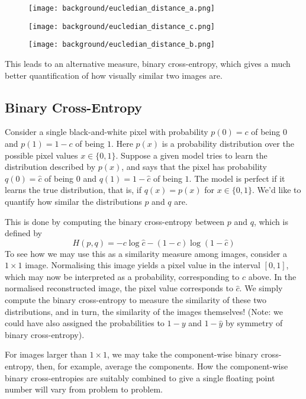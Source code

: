 \begin{figure}[!htb]
\centering
{}
\centering
  \texttt{[image: background/eucledian\_distance\_a.png]}
  \caption{}\label{fig:eucledian_distance_a}
\endminipage\hfill
{}
\centering
  \texttt{[image: background/eucledian\_distance\_c.png]}
  \caption{}\label{fig:eucledian_distance_c}
\endminipage\hfill
{}%
\centering
  \texttt{[image: background/eucledian\_distance\_b.png]}
  \caption{}\label{fig:eucledian_distance_b}
\endminipage
\end{figure}

This leads to an alternative measure, binary cross-entropy, which gives a much better quantification of how visually similar two images are.

\subsection{Binary Cross-Entropy}
Consider a single black-and-white pixel with probability $p(0) = c$ of being $0$ and $p(1) = 1 - c$ of being $1$. Here $p(x)$ is a probability distribution over the possible pixel values $x \in \{0, 1\}$. Suppose a given model tries to learn the distribution described by $p(x)$, and says that the pixel has probability $q(0) = \hat{c}$ of being $0$ and $q(1) = 1 - \hat{c}$ of being $1$. The model is perfect if it learns the true distribution, that is, if $q(x) = p(x)$ for $x\in\{0,1\}$. We'd like to quantify how similar the distributions $p$ and $q$ are.

This is done by computing the binary cross-entropy between $p$ and $q$, which is defined by $$H(p,q) = -c\log\hat{c} - (1-c)\log(1-\hat{c})$$ To see how we may use this as a similarity measure among images, consider a $1\times1$ image. Normalising this image yields a pixel value in the interval $[0, 1]$, which may now be interpreted as a probability, corresponding to $c$ above. In the normalised reconstructed image, the pixel value corresponds to $\hat{c}$. We simply compute the binary cross-entropy to measure the similarity of these two distributions, and in turn, the similarity of the images themselves! (Note: we could have also assigned the probabilities to $1-y$ and $1-\hat{y}$ by symmetry of binary cross-entropy).

For images larger than $1 \times 1$, we may take the component-wise binary cross-entropy, then, for example, average the components. How the component-wise binary cross-entropies are suitably combined to give a single floating point number will vary from problem to problem.